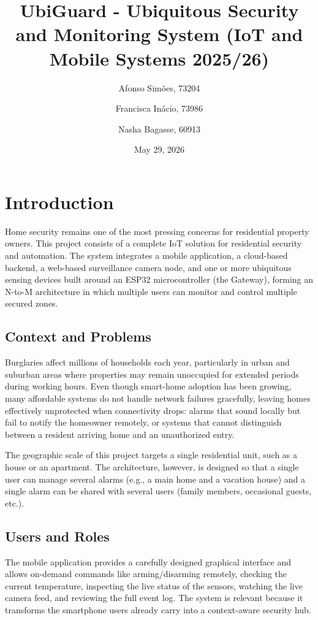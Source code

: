 \documentclass[10pt,twocolumn]{article}
\title{\textbf{UbiGuard - Ubiquitous Security and Monitoring System (IoT and Mobile Systems 2025/26)}}
\author{
Afonso Simões, 73204
\and
Francisca Inácio, 73986
\and
Nasha Bagasse, 60913
}
\date{May 29, 2026}
\begin{document}
\maketitle

\section{Introduction}
Home security remains one of the most pressing concerns for residential property owners. This project consists of a complete IoT solution for residential security and automation. The system integrates a mobile application, a cloud-based backend, a web-based surveillance camera node, and one or more ubiquitous sensing devices built around an ESP32 microcontroller (the Gateway), forming an N-to-M architecture in which multiple users can monitor and control multiple secured zones.

\subsection{Context and Problems}
Burglaries affect millions of households each year, particularly in urban and suburban areas where properties may remain unoccupied for extended periods during working hours. Even though smart-home adoption has been growing, many affordable systems do not handle network failures gracefully, leaving homes effectively unprotected when connectivity drops: alarms that sound locally but fail to notify the homeowner remotely, or systems that cannot distinguish between a resident arriving home and an unauthorized entry.

The geographic scale of this project targets a single residential unit, such as a house or an apartment. The architecture, however, is designed so that a single user can manage several alarms (e.g., a main home and a vacation house) and a single alarm can be shared with several users (family members, occasional guests, etc.).

\subsection{Users and Roles}
The mobile application provides a carefully designed graphical interface and allows on-demand commands like arming/disarming remotely, checking the current temperature, inspecting the live status of the sensors, watching the live camera feed, and reviewing the full event log. The system is relevant because it transforms the smartphone users already carry into a context-aware security hub.
\end{document}
